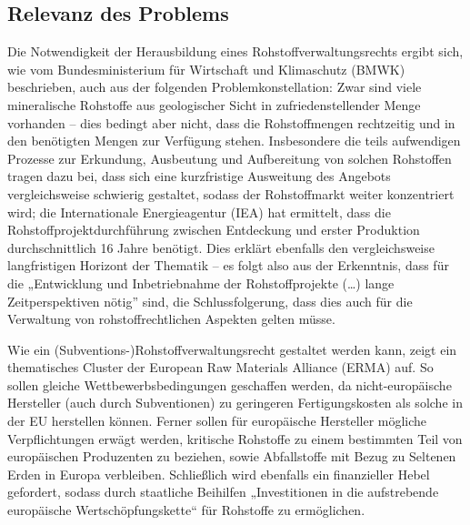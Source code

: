\documentclass[12pt,a4paper,oneside]{book} %
\begin{document}
	\subsection{Relevanz des Problems}
	Die Notwendigkeit der Herausbildung eines Rohstoffverwaltungsrechts ergibt sich, wie vom Bundesministerium für Wirtschaft und Klimaschutz (BMWK) beschrieben,\autocite{bundesministerium_fur_wirtschaft_und_klimaschutz_bmwk_industriepolitik_2023} auch aus der folgenden Problemkonstellation: Zwar sind viele mineralische Rohstoffe aus geologischer Sicht in zufriedenstellender Menge vorhanden – dies bedingt aber nicht, dass die Rohstoffmengen rechtzeitig und in den benötigten Mengen zur Verfügung stehen. Insbesondere die teils aufwendigen Prozesse zur Erkundung, Ausbeutung und Aufbereitung von solchen Rohstoffen tragen dazu bei, dass sich eine kurzfristige Ausweitung des Angebots vergleichsweise schwierig gestaltet, sodass der Rohstoffmarkt weiter konzentriert wird; die Internationale Energieagentur (IEA) hat ermittelt, dass die Rohstoffprojektdurchführung zwischen Entdeckung und erster Produktion durchschnittlich 16 Jahre benötigt.\autocite[12]{international_energy_agency_role_2021} Dies erklärt ebenfalls den vergleichsweise langfristigen Horizont der Thematik – es folgt also aus der Erkenntnis, dass für die „Entwicklung und Inbetriebnahme der Rohstoffprojekte (…) lange Zeitperspektiven nötig” sind,\autocite[13]{bundesministerium_fur_wirtschaft_und_klimaschutz_bmwk_industriepolitik_2023} die Schlussfolgerung, dass dies auch für die Verwaltung von rohstoffrechtlichen Aspekten gelten müsse.
	
	Wie ein (Subventions-)Rohstoffverwaltungsrecht gestaltet werden kann, zeigt ein thematisches Cluster der European Raw Materials Alliance (ERMA) auf. So sollen gleiche Wettbewerbsbedingungen geschaffen werden, da nicht-europäische Hersteller (auch durch Subventionen) zu geringeren Fertigungskosten als solche in der EU herstellen können. Ferner sollen für europäische Hersteller mögliche Verpflichtungen erwägt werden, kritische Rohstoffe zu einem bestimmten Teil von europäischen Produzenten zu beziehen, sowie Abfallstoffe mit Bezug zu Seltenen Erden in Europa verbleiben. Schließlich wird ebenfalls ein finanzieller Hebel gefordert, sodass durch staatliche Beihilfen „Investitionen in die aufstrebende europäische Wertschöpfungskette“ für Rohstoffe zu ermöglichen.\autocite[7]{gaus_rare_2021}
	
	
\end{document}
